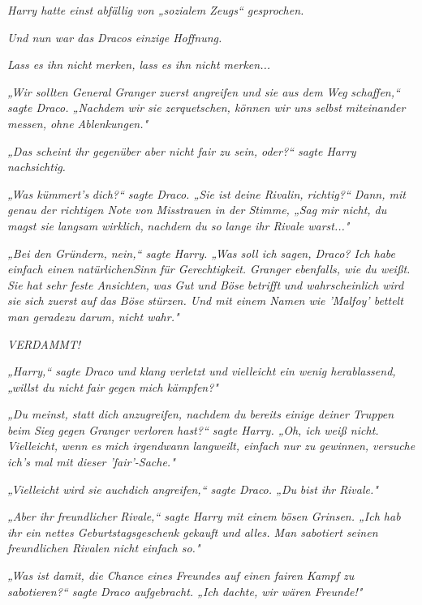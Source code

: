 {\emph{Harry hatte einst abfällig von „sozialem Zeugs“ gesprochen.}

\emph{Und nun war das Dracos einzige Hoffnung.}

\emph{Lass es ihn nicht merken, lass es ihn nicht merken...}

\emph{„Wir sollten General Granger zuerst angreifen und sie aus dem Weg} \emph{schaffen,“ sagte Draco. „Nachdem wir sie zerquetschen, können wir uns selbst miteinander messen, ohne Ablenkungen."}

\emph{„Das scheint ihr gegenüber aber nicht fair zu sein, oder?“ sagte Harry nachsichtig.}

\emph{„Was kümmert's} \emph{\emph{dich?}“ sagte Draco. „Sie ist deine Rivalin, richtig?“ Dann, mit genau der richtigen Note von Misstrauen in der Stimme, „Sag mir nicht, du magst sie langsam} \emph{\emph{wirklich,}} \emph{nachdem du so lange ihr Rivale warst..."}

\emph{„Bei den Gründern, nein,“ sagte Harry. „Was soll ich sagen, Draco? Ich habe einfach einen} \emph{natürlichenSinn für Gerechtigkeit. Granger ebenfalls, wie du weißt. Sie hat sehr feste Ansichten,} \emph{was} \emph{Gut und Böse} \emph{betrifft} \emph{und wahrscheinlich wird sie} \emph{sich} \emph{zuerst} \emph{auf} \emph{das Böse} \emph{stürzen. Und mit einem Namen wie 'Malfoy' bettelt man geradezu darum,} \emph{nicht wahr."}

\emph{\emph{VERDAMMT!}}

\emph{„Harry,“ sagte Draco und klang verletzt und vielleicht ein wenig herablassend, „willst du nicht} \emph{\emph{fair}} \emph{gegen mich kämpfen?"}

\emph{„Du meinst, statt dich anzugreifen, nachdem du bereits einige deiner Truppen beim Sieg gegen Granger verloren hast?“ sagte Harry. „Oh, ich weiß nicht. Vielleicht,} \emph{wenn} \emph{es mich} \emph{irgendwann} \emph{langweilt, einfach nur zu gewinnen, versuche ich's mal mit dieser 'fair'-Sache."}

\emph{„Vielleicht wird sie} \emph{auch\emph{dich}} \emph{angreifen,“ sagte Draco. „\emph{Du}} \emph{bist ihr Rivale."}

\emph{„Aber ihr} \emph{\emph{freundlicher}} \emph{Rivale,“ sagte Harry mit einem bösen Grinsen. „Ich hab ihr ein nettes Geburtstagsgeschenk gekauft und alles. Man sabotiert seinen freundlichen Rivalen nicht einfach so."}

\emph{„Was ist damit, die Chance eines} \emph{\emph{Freundes}} \emph{auf einen fairen Kampf zu sabotieren?“ sagte Draco aufgebracht. „Ich dachte, wir wären Freunde!"}

}
